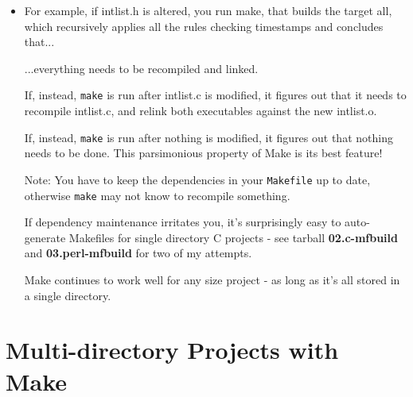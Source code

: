\documentclass[handout]{beamer}
\begin{document}
\begin{frame}[fragile]

\begin{itemize}
      \item
       For example, if \alert{intlist.h} is altered, you run \alert{make},
       that builds the target \alert{all}, which recursively applies all
       the rules checking timestamps and concludes that...

       \pitem
       ...everything needs to be recompiled and linked.

      \pitem
      If, instead, \verb+make+ is run after \alert{intlist.c} is modified,
      it figures out that it needs to recompile \alert{intlist.c},
      and relink both executables against the
      new \alert{intlist.o}.

      \pitem
      If, instead, \verb+make+ is run after nothing is modified,
      it figures out that nothing needs to be done.
      This \alert{parsimonious} property of Make is its best feature!

      \pitem
      Note: You have to keep the dependencies in your \verb+Makefile+
      up to date, otherwise \verb+make+ may not know to recompile something.

      \pitem
      If dependency maintenance irritates you, it's surprisingly easy to
      auto-generate Makefiles for single directory C projects - see tarball
      {\bf 02.c-mfbuild} and {\bf 03.perl-mfbuild} for two of my attempts.

      \pitem 
      Make continues to work well for any size project - as long as it's all stored
      in a single directory.



\end{itemize}

\end{frame}

\section{Multi-directory Projects with Make}
\end{document}
